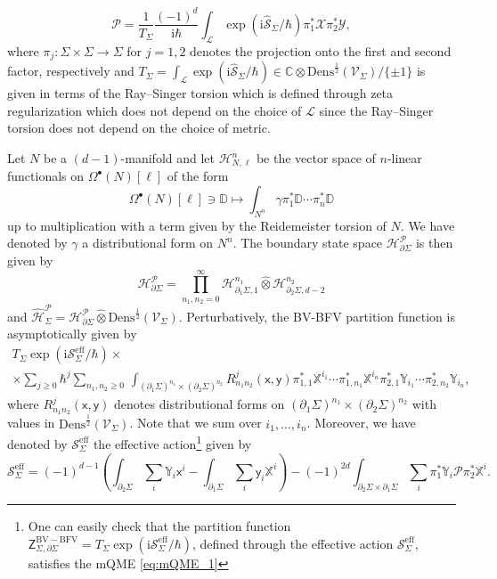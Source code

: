 \documentclass[11pt,colorinlistoftodos]{amsart}
\numberwithin{equation}{subsection}
\theoremstyle{plain}
\theoremstyle{definition}
\theoremstyle{remark}
\newcommand{\C}{\mathbb{C}}
\newcommand{\de}{\partial}
\newcommand{\calH}{\mathcal{H}}
\newcommand{\calS}{\mathcal{S}}
\newcommand{\calL}{\mathcal{L}}
\newcommand{\calP}{\mathcal{P}}
\newcommand{\I}{\mathrm{i}}
\newcommand{\calV}{\mathcal{V}}
\begin{document}
\[
\mathscr{P}=\frac{1}{T_\Sigma}\frac{(-1)^d}{\I\hbar}\int_\calL \exp\left(\I\widehat{\calS}_\Sigma/\hbar\right)\pi_1^*\mathscr{X}\pi_2^*\mathscr{Y},
\]
where $\pi_j\colon \Sigma\times\Sigma\to \Sigma$ for $j=1,2$ denotes the projection onto the first and second factor, respectively and $T_\Sigma=\int_\calL\exp(\I\widehat{\calS}_\Sigma/\hbar)\in\C\otimes \mathrm{Dens}^\frac{1}{2}(\calV_\Sigma)/\{\pm 1\}$ is given in terms of the Ray--Singer torsion \cite{RaySinger1971} which is defined through zeta regularization which does not depend on the choice of $\calL$ since the Ray--Singer torsion does not depend on the choice of metric. 

Let $N$ be a $(d-1)$-manifold and let $\calH^n_{N,\ell}$ be the vector space of $n$-linear functionals on $\Omega^\bullet(N)[\ell]$ of the form 
\[
\Omega^\bullet(N)[\ell]\ni \mathds{D}\mapsto \int_{N^n}\gamma\pi^*_1\mathds{D}\dotsm \pi^*_n\mathds{D}
\]
up to multiplication with a term given by the Reidemeister torsion \cite{Reidemeister1935} of $N$. We have denoted by $\gamma$ a distributional form on $N^n$. 
The boundary state space $\calH^\calP_{\de\Sigma}$ is then given by
\[
\calH^\calP_{\de\Sigma}=\prod_{n_1,n_2=0}^\infty \calH^{n_1}_{\de_1\Sigma,1}\widehat{\otimes}\calH^{n_2}_{\de_2\Sigma,d-2}
\]
and $\widehat{\calH}^\calP_{\Sigma}=\calH^\calP_{\de\Sigma}\widehat{\otimes}\mathrm{Dens}^\frac{1}{2}(\calV_\Sigma)$. Perturbatively, the BV-BFV partition function is asymptotically given by 
\begin{multline*}
T_\Sigma\exp(\I\calS^\mathrm{eff}_\Sigma/\hbar)\times\\\times\sum_{j\geq 0}\hbar^j\sum_{n_1,n_2\geq 0}\,\int_{(\de_1\Sigma)^{n_1}\times(\de_2\Sigma)^{n_2}}R^j_{n_1n_2}(\mathsf{x},\mathsf{y})\pi_{1,1}^*\mathds{X}^{i_1}\dotsm \pi^*_{1,n_1}\mathds{X}^{i_n}\pi^*_{2,1}\mathds{Y}_{i_1}\dotsm \pi^*_{2,n_2}\mathds{Y}_{i_n},
\end{multline*}
where $R^j_{n_1n_2}(\mathsf{x},\mathsf{y})$ denotes distributional forms on $(\de_1\Sigma)^{n_1}\times(\de_2\Sigma)^{n_2}$ with values in $\mathrm{Dens}^\frac{1}{2}(\calV_\Sigma)$. Note that we sum over $i_1,\ldots,i_n$. Moreover, we have denoted by $\calS^\mathrm{eff}_\Sigma$ the effective action\footnote{One can easily check that the partition function $\mathsf{Z}^{\scriptscriptstyle\mathrm{BV-BFV}}_{\Sigma,\de\Sigma}=T_\Sigma\exp(\I\calS^\mathrm{eff}_\Sigma/\hbar)$, defined through the effective action $\calS^\mathrm{eff}_\Sigma$, satisfies the mQME \eqref{eq:mQME_1}} given by 
\[
\calS^\mathrm{eff}_\Sigma=(-1)^{d-1}\left(\int_{\de_2\Sigma}\sum_i\mathds{Y}_i\mathsf{x}^i-\int_{\de_1\Sigma}\sum_i\mathsf{y}_i\mathds{X}^i\right)-(-1)^{2d}\int_{\de_2\Sigma\times\de_1\Sigma}\sum_i\pi^*_1\mathds{Y}_i\mathscr{P}\pi^*_{2}\mathds{X}^i.
\]
\end{document}
